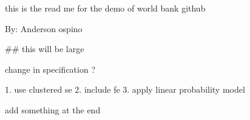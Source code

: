 this is the read me for the demo of world bank github

By: Anderson ospino

## this will be large



change in specification ?

1. use clustered se
2. include fe
3. apply linear probability model

add something at the end

